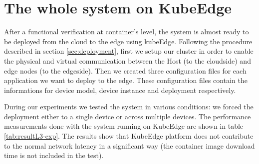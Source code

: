 \section{The whole system on KubeEdge}
After a functional verification at container's level, the system is almost ready to be deployed from the cloud to the edge using kubeEdge.
Following the procedure described in section \ref{sec:deployment}, first we setup our cluster in order to enable the physical and virtual communication between the Host (to the cloudside) and edge nodes (to the edgeside).
Then we created three configuration files for each application we want to deploy to the edge.
These configuration files contain the informations for device model, device instance and deployment respectively.

During our experiments we tested the system in various conditions: we forced the deployment either to a single device or across multiple devices.
The performance measurements done with the system running on KubeEdge are shown in table \ref{tab:resultL3-exp}.
The results show that KubeEdge platform does not contribute to the normal network latency in a significant way (the container image download time is not included in the test).




